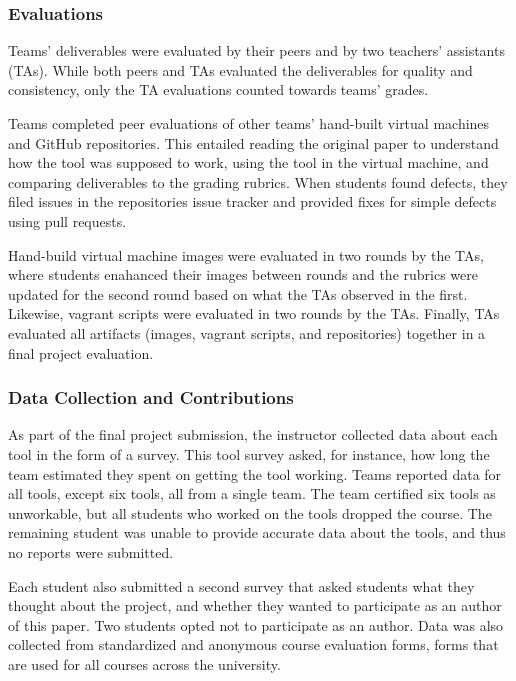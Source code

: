 \documentclass[10pt,conference]{IEEEtran}
\begin{document}
\subsubsection{Evaluations}

Teams' deliverables were evaluated by their 
peers and by two teachers' assistants (TAs).
While both peers and TAs evaluated the deliverables
for quality and consistency, only the TA evaluations
counted towards teams' grades.

Teams completed peer evaluations of other teams' hand-built 
virtual machines and GitHub repositories.
This entailed reading the original paper to understand
how the tool was supposed to work, 
using the tool in the virtual machine,
and comparing deliverables to the grading rubrics.
When students found defects, they filed issues 
in the repositories issue tracker and provided
fixes for simple defects using pull requests.


Hand-build virtual machine images were evaluated in 
two rounds by the TAs, where students enahanced their
images between rounds and the rubrics were updated
for the second round based on what the TAs 
observed in the first.
Likewise, vagrant scripts were evaluated in two rounds
by the TAs.
Finally, TAs evaluated all artifacts (images, vagrant 
scripts, and repositories) together in a final project 
evaluation.

\subsubsection{Data Collection and Contributions}

As part of the final project submission, 
the instructor collected data about 
each tool in the form of a survey.
This tool survey asked, for instance, how long
the team estimated they spent on getting 
the tool working.
Teams reported data for all tools, except six tools,
all from a single team.
The team certified six tools as unworkable,
but all students who worked on the tools dropped
the course.
The remaining student was unable 
to provide accurate data about the tools, and thus 
no reports were submitted.

Each student also submitted a second survey that
asked students what they thought about the project,
and whether they wanted to participate as an
author of this paper.
Two students opted not to participate as an author.
Data was also collected from standardized and 
anonymous course evaluation forms, forms
that are used for all courses 
across the university.
\end{document}
